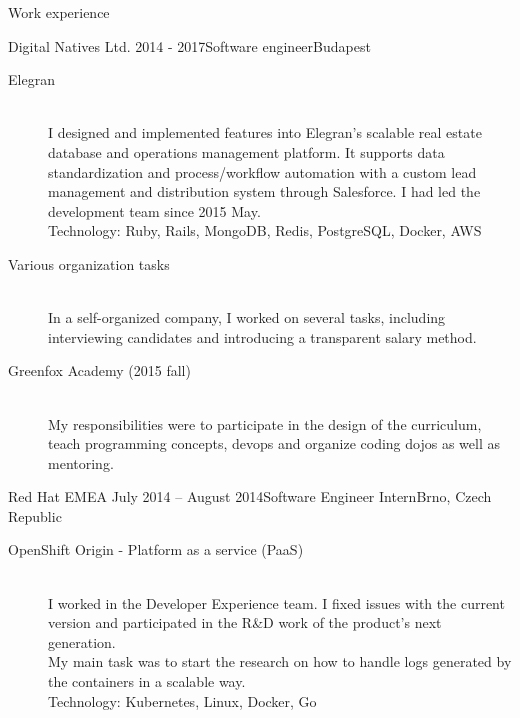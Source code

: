 \documentclass{resume} %
\begin{document}
\begin{rSection}{Work experience}
\begin{rSubsection}{Digital Natives Ltd.}
{2014 - 2017}{Software engineer}{Budapest}
  \begin{description}
    \item[Elegran] \hfill \\
    I designed and implemented features into Elegran’s scalable real estate
    database and operations management platform. It supports data standardization
    and process/workflow automation with a custom lead management and distribution
    system through Salesforce. I had led the development team since 2015 May. \\
    Technology: Ruby, Rails, MongoDB, Redis, PostgreSQL, Docker, AWS
  \end{description}
  \begin{description}
    \item[Various organization tasks] \hfill \\
    In a self-organized company, I worked on several tasks, including interviewing candidates
    and introducing a transparent salary method.
  \end{description}
  \begin{description}
    \item[Greenfox Academy (2015 fall)] \hfill \\
    My responsibilities were to participate in the design of the curriculum, teach
    programming concepts, devops and organize coding dojos as well as mentoring.
  \end{description}
\end{rSubsection}

\begin{rSubsection}{Red Hat EMEA}
{July 2014 – August 2014}{Software Engineer Intern}{Brno, Czech Republic}
  \begin{description}
    \item[OpenShift Origin - Platform as a service (PaaS)] \hfill \\
    I worked in the Developer Experience team. I fixed issues with the current version
    and participated in the R\&D work of the product's next generation.\\
    My main task was to start the research on how to handle logs generated by the containers
    in a scalable way. \\
    Technology: Kubernetes, Linux, Docker, Go
  \end{description}
\end{rSubsection}


\end{rSection}
\end{document}
